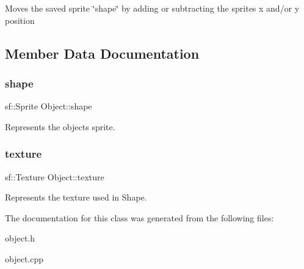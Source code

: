 Moves the saved sprite \char`\"{}shape\char`\"{} by adding or subtracting the sprites x and/or y position 

\subsection{Member Data Documentation}
\mbox{\label{classObject_a563c6c058bb3549ef8bc8cbc01c4e7e1}} 
\subsubsection{\texorpdfstring{shape}{shape}}
{\footnotesize\ttfamily sf\+::\+Sprite Object\+::shape\hspace{0.3cm}{\ttfamily [protected]}}

Represents the objects sprite. \mbox{\label{classObject_a8abc6192982ee39b2dc9d9b05cc155ee}} 
\subsubsection{\texorpdfstring{texture}{texture}}
{\footnotesize\ttfamily sf\+::\+Texture Object\+::texture\hspace{0.3cm}{\ttfamily [protected]}}

Represents the texture used in Shape. 

The documentation for this class was generated from the following files\+:\begin{DoxyCompactItemize}
\item 
object.\+h\item 
object.\+cpp\end{DoxyCompactItemize}
